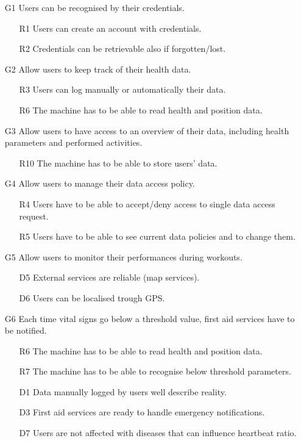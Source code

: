 \documentclass{article}
\begin{document}
\begin{itemize}	

	\item [G1] Users can be recognised by their credentials.
	\begin{itemize}
		\item [R1] Users can create an account with credentials.
		\item [R2] Credentials can be retrievable also if 
		forgotten/lost.
	\end{itemize} 

	\item [G2] Allow users to keep track of their health data.	
	\begin{itemize}
		\item [R3] Users can log manually or automatically their data.
		\item [R6] The machine has to be able to read health and 
		position data.
	\end{itemize}
	
	\item [G3] Allow users to have access to an overview of their 
	data, including health parameters and performed activities.
	\begin{itemize}
		\item [R10] The machine has to be able to store users’ data.
	\end{itemize}
	
	\item [G4] Allow users to manage their data access policy.
	\begin{itemize}
		\item [R4] Users have to be able to accept/deny access to 
		single data access request.
		\item [R5] Users have to be able to see current data policies
		and to change them.
	\end{itemize}
	
	\item [G5] Allow users to monitor their performances during 
	workouts.	
	\begin{itemize}
		\item [D5] External services are reliable (map services).
		\item [D6] Users can be localised trough GPS.
	\end{itemize}	
	
	\item [G6] Each time vital signs go below a threshold value, first 
	aid services have to be notified.
	\begin{itemize}
		\item [R6] The machine has to be able to read health and 
		position data. 
		\item [R7] The machine has to be able to recognise below 
		threshold parameters.
		\item [D1] Data manually logged by users well describe 
		reality.
		\item [D3] First aid services are ready to handle emergency
		notiﬁcations.
		\item [D7]Users are not affected with diseases that can 
		influence heartbeat ratio.
	\end{itemize}
		

\end{itemize}
\end{document}

